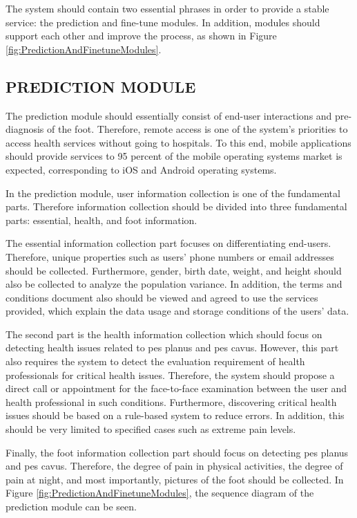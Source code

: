 The system should contain two essential phrases in order to provide a stable service: the prediction and fine-tune modules. In addition, modules should support each other and improve the process, as shown in Figure \ref{fig:PredictionAndFinetuneModules}.

\subsection{ PREDICTION MODULE }

The prediction module should essentially consist of end-user interactions and pre-diagnosis of the foot. Therefore, remote access is one of the system's priorities to access health services without going to hospitals. To this end, mobile applications should provide services to 95 percent of the mobile operating systems market is expected, corresponding to iOS and Android operating systems.

In the prediction module, user information collection is one of the fundamental parts. Therefore information collection should be divided into three fundamental parts: essential, health, and foot information. 

The essential information collection part focuses on differentiating end-users. Therefore, unique properties such as users' phone numbers or email addresses should be collected. Furthermore, gender, birth date, weight, and height should also be collected to analyze the population variance. In addition, the terms and conditions document also should be viewed and agreed to use the services provided, which explain the data usage and storage conditions of the users' data.

The second part is the health information collection which should focus on detecting health issues related to pes planus and pes cavus. However, this part also requires the system to detect the evaluation requirement of health professionals for critical health issues. Therefore, the system should propose a direct call or appointment for the face-to-face examination between the user and health professional in such conditions. Furthermore, discovering critical health issues should be based on a rule-based system to reduce errors. In addition, this should be very limited to specified cases such as extreme pain levels.

Finally, the foot information collection part should focus on detecting pes planus and pes cavus. Therefore, the degree of pain in physical activities, the degree of pain at night, and most importantly, pictures of the foot should be collected. In Figure \ref{fig:PredictionAndFinetuneModules}, the sequence diagram of the prediction module can be seen.

